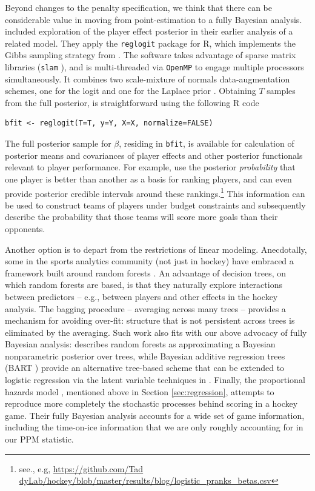 Beyond changes to the penalty specification, we think that there can be
considerable value in moving from point-estimation to a fully Bayesian
analysis. \cite{gramacy:jensen:taddy:2013} included exploration of the player
effect posterior in their earlier analysis of a related model.  They apply the
{\tt reglogit} package \cite{reglogit} for {\sf R}, which implements the Gibbs
sampling strategy from \cite{gra:pols:2012}. The software takes advantage of
sparse matrix libraries ({\tt slam} \cite{slam}), and is multi-threaded via
{\tt OpenMP} to engage multiple processors simultaneously. It combines two
scale-mixture of normals data-augmentation schemes, one for the logit
\cite{holmes:held:2006} and one for the Laplace prior \cite{park:casella:2008}.
Obtaining $T$ samples from the full posterior, is straightforward using the
following {\sf R} code
\begin{verbatim}
bfit <- reglogit(T=T, y=Y, X=X, normalize=FALSE)
\end{verbatim}
The full posterior sample for $\beta$, residing in {\tt bfit}, is available
for calculation of posterior means and covariances of player effects and other
posterior functionals relevant to player performance. For example,
\cite{gramacy:jensen:taddy:2013} use the posterior \textit{probability} that
one player is better than another as a basis for ranking players, and can even
provide posterior credible intervals around these rankings.\footnote{see.,
e.g,
\url{https://github.com/Tad dyLab/hockey/blob/master/results/blog/logistic_pranks_betas.csv}
}  This information can be used to construct teams of players under budget constraints and
subsequently describe the probability that those teams will score more goals
than their opponents.  

Another option is to depart from the restrictions of linear modeling.  Anecdotally, some in the
sports analytics community (not just in hockey) have embraced a framework
built around random forests
\cite{breiman:2001}.  An advantage of decision trees, on which random forests
are based, is that they naturally explore interactions between predictors --
e.g., between players and other effects in the hockey analysis.  The bagging
procedure -- averaging across many trees -- provides a mechanism for avoiding
over-fit: structure that is not persistent across trees is eliminated by the
averaging. Such work also fits with our above advocacy of fully Bayesian
analysis:
 \cite{taddy:eta:2015} describes random forests as approximating a Bayesian
 nonparametric posterior over trees, while  Bayesian additive regression trees
 (BART
\cite{ChipGeorMcCu2010}) provide an alternative tree-based scheme that can be
extended to logistic regression via the  latent variable techniques in
\cite{gra:pols:2012}.   Finally, the proportional hazards model
\cite{ThoVenJen12}, mentioned above in Section \ref{sec:regression},  attempts to reproduce more completely the stochastic
processes behind scoring in a hockey game. Their fully Bayesian analysis
accounts for a wide set of game information, including the time-on-ice
information that we are only roughly accounting for in our PPM statistic.

